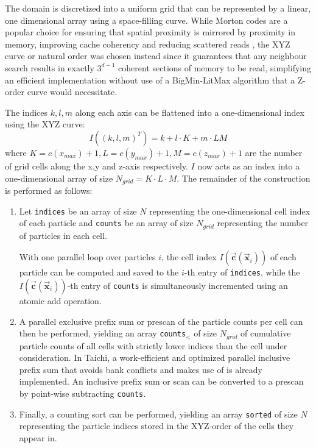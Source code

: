 \documentclass[oneside, a4paper]{book}
\newcommand\vek[1]{\vec{\bm{#1}}}
\newcommand\br[1]{\left(#1\right)}
\begin{document}
\begin{appendices}
    The domain is discretized into a uniform grid that can be represented by a linear, one dimensional array using a space-filling curve. While Morton codes are a popular choice \autocite{compressed-neighbour-lists} for ensuring that spatial proximity is mirrored by proximity in memory, improving cache coherency and reducing scattered reads \autocite{hoetzlein-rama-counting-sort}, the XYZ curve or natural order was chosen instead since it guarantees that any neighbour search results in exactly $3^{d-1}$ coherent sections of memory to be read, simplifying an efficient implementation without use of a BigMin-LitMax algorithm \autocite{bigminlitmax} that a Z-order curve would necessitate.
    
    The indices $k,l,m$ along each axis can be flattened into a one-dimensional index using the XYZ curve:
    \begin{equation}\label{eq:counting-sort-xyz}
      I\br{\br{k,l,m}^T} = k + l\cdot K + m\cdot LM
    \end{equation}
    where $K=c(x_{max})+1, L=c(y_{max})+1, M=c(z_{max})+1$ are the  number of grid cells along the x,y and z-axis respectively. $I$ now acts as an index into a one-dimensional array of size $N_{grid} = K\cdot L\cdot M$. The remainder of the construction is performed as follows:
    \begin{enumerate}
      \item Let \texttt{indices} be an array of size $N$ representing the one-dimensional cell index of each particle and \texttt{counts} be an array of size $N_{grid}$ representing the number of particles in each cell.

      With one parallel loop over particles $i$, the cell index $I\br{\vek{c}(\vek{x}_i)}$ of each particle can be computed and saved to the $i$-th entry of \texttt{indices}, while the $I\br{\vek{c}(\vek{x}_i)}$-th entry of \texttt{counts} is simultaneously incremented using an atomic add operation.
      \item A parallel exclusive prefix sum or prescan of the particle counts per cell can then be performed, yielding an array \texttt{counts}$_<$ of size $N_{grid}$ of cumulative particle counts of all cells with strictly lower indices than the cell under consideration. In Taichi, a work-efficient and optimized parallel inclusive prefix sum that avoids bank conflicts \autocite{parallel-prefix-scan} and makes use of \autocite[Blelloch scans]{blelloch-scans} is already implemented. An inclusive prefix sum or scan can be converted to a prescan by point-wise subtracting \texttt{counts}.
      \item Finally, a counting sort can be performed, yielding an array \texttt{sorted} of size $N$ representing the particle indices stored in the XYZ-order of the cells they appear in.
      

\end{enumerate}
\end{appendices}
\end{document}
